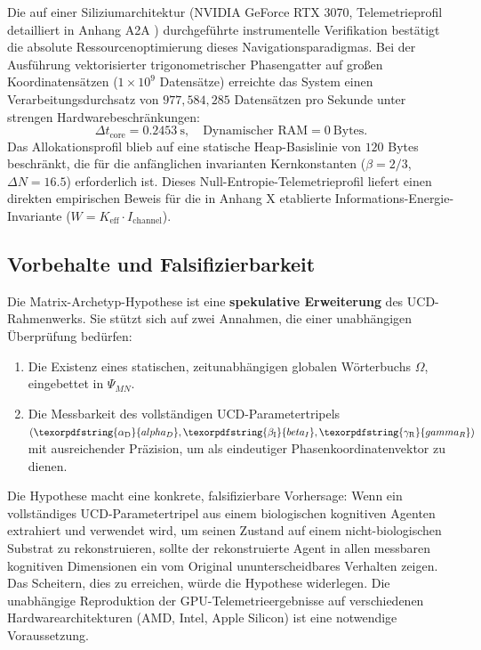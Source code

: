 \documentclass[12pt,a4paper]{article}
\DeclareRobustCommand{\alD}{\texorpdfstring{\ensuremath{\alpha_{\mathrm{D}}}}{alpha_D}}
\DeclareRobustCommand{\beI}{\texorpdfstring{\ensuremath{\beta_{\mathrm{I}}}}{beta_I}}
\DeclareRobustCommand{\gaR}{\texorpdfstring{\ensuremath{\gamma_{\mathrm{R}}}}{gamma_R}}
\begin{document}
	Die auf einer Siliziumarchitektur (NVIDIA GeForce RTX 3070, Telemetrieprofil detailliert in Anhang A2A \cite{yuct_a2a}) durchgeführte instrumentelle Verifikation bestätigt die absolute Ressourcenoptimierung dieses Navigationsparadigmas. Bei der Ausführung vektorisierter trigonometrischer Phasengatter auf großen Koordinatensätzen (\(1\times10^9\) Datensätze) erreichte das System einen Verarbeitungsdurchsatz von \(977,584,285\) Datensätzen pro Sekunde unter strengen Hardwarebeschränkungen:
	\begin{equation}
		\Delta t_{\mathrm{core}} = 0.2453\ \text{s}, \quad \text{Dynamischer RAM} = 0\ \text{Bytes}.
	\end{equation}
	Das Allokationsprofil blieb auf eine statische Heap-Basislinie von \(120\) Bytes beschränkt, die für die anfänglichen invarianten Kernkonstanten (\(\beta = 2/3\), \(\Delta N = 16.5\)) erforderlich ist. Dieses Null-Entropie-Telemetrieprofil liefert einen direkten empirischen Beweis für die in Anhang X \cite{yuct_appX} etablierte Informations-Energie-Invariante (\(W = K_{\mathrm{eff}} \cdot I_{\mathrm{channel}}\)).
	
	\subsection{Vorbehalte und Falsifizierbarkeit}
	
	Die Matrix-Archetyp-Hypothese ist eine \textbf{spekulative Erweiterung} des UCD-Rahmenwerks. Sie stützt sich auf zwei Annahmen, die einer unabhängigen Überprüfung bedürfen:
	\begin{enumerate}
		\item Die Existenz eines statischen, zeitunabhängigen globalen Wörterbuchs \(\Omega\), eingebettet in \(\Psi_{MN}\).
		\item Die Messbarkeit des vollständigen UCD-Parametertripels \((\alD, \beI, \gaR)\) mit ausreichender Präzision, um als eindeutiger Phasenkoordinatenvektor zu dienen.
	\end{enumerate}
	Die Hypothese macht eine konkrete, falsifizierbare Vorhersage: Wenn ein vollständiges UCD-Parametertripel aus einem biologischen kognitiven Agenten extrahiert und verwendet wird, um seinen Zustand auf einem nicht-biologischen Substrat zu rekonstruieren, sollte der rekonstruierte Agent in allen messbaren kognitiven Dimensionen ein vom Original ununterscheidbares Verhalten zeigen. Das Scheitern, dies zu erreichen, würde die Hypothese widerlegen. Die unabhängige Reproduktion der GPU-Telemetrieergebnisse auf verschiedenen Hardwarearchitekturen (AMD, Intel, Apple Silicon) ist eine notwendige Voraussetzung.
	
\end{document}
